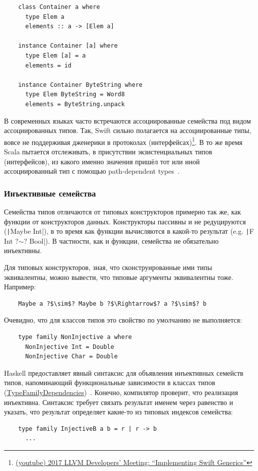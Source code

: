 \begin{verbatim}
    class Container a where
      type Elem a
      elements :: a -> [Elem a]

    instance Container [a] where
      type Elem [a] = a
      elements = id

    instance Container ByteString where
      type Elem ByteString = Word8
      elements = ByteString.unpack
\end{verbatim}

В современных языках часто встречаются ассоциированные семейства под видом ассоциированных типов.
Так, Swift сильно полагается на ассоциированные типы, вовсе не поддерживая дженерики в протоколах (интерфейсах)\footnote{\href{https://youtu.be/ctS8FzqcRug?si=y_ZYnuUOulA33d_X}{(youtube) 2017 LLVM Developers’ Meeting: ``Implementing Swift Generics''}}.
В то же время Scala пытается отслеживать, в присутствии экзистенциальных типов (интерфейсов), из какого именно значения пришёл тот или иной ассоциированный тип с помощью path-dependent types~\cite{amin2014foundations}.

\subsubsection{Инъективные семейства}

Семейства типов отличаются от типовых конструкторов примерно так же, как функции от конструкторов данных.
Конструкторы пассивны и не редуцируются (\texttt|Maybe Int|), в то время как функции вычисляются в какой-то результат (e.g. \texttt|F Int ?$\sim$? Bool|).
В частности, как и функции, семейства не обязательно инъективны.

Для типовых конструкторов, зная, что сконструированные ими типы эквивалентны, можно вывести, что типовые аргументы эквивалентны тоже.
Например:
\begin{verbatim}
    Maybe a ?$\sim$? Maybe b ?$\Rightarrow$? a ?$\sim$? b
\end{verbatim}

Очевидно, что для классов типов это свойство по умолчанию не выполняется:
\begin{verbatim}
    type family NonInjective a where
      NonInjective Int = Double
      NonInjective Char = Double
\end{verbatim}

Haskell предоставляет явный синтаксис для объявления инъективных семейств типов, напоминающий функциональные зависимости в классах типов (\href{https://ghc.gitlab.haskell.org/ghc/doc/users_guide/exts/type_families.html#extension-TypeFamilyDependencies}{TypeFamilyDependencies})~\cite{stolarek2015injective}.
Конечно, компилятор проверит, что реализация инъективна.
Синтаксис требует связать результат именем через равенство и указать, что результат определяет какие-то из типовых индексов семейства:
\begin{verbatim}
    type family InjectiveB a b = r | r -> b
      ...
\end{verbatim}

